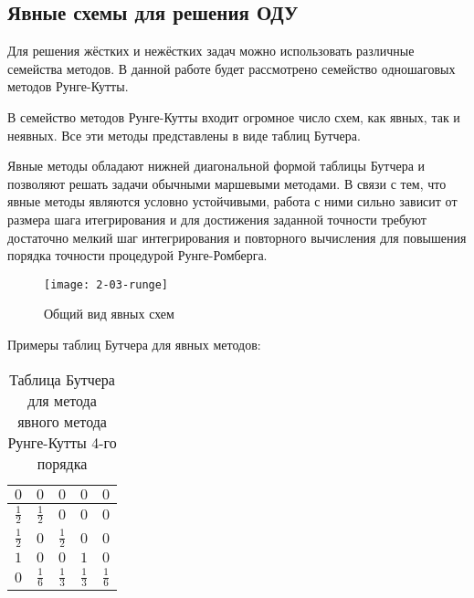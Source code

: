 \subsection{Явные схемы для решения ОДУ}

Для решения жёстких и нежёстких задач можно использовать различные семейства методов. В данной работе будет рассмотрено семейство
одношаговых методов Рунге-Кутты.

В семейство методов Рунге-Кутты входит огромное число схем, как явных, так и неявных. Все эти методы представлены в виде таблиц
Бутчера.

Явные методы обладают нижней диагональной формой таблицы Бутчера и позволяют решать задачи обычными маршевыми методами. В связи с тем,
что явные методы являются условно устойчивыми, работа с ними сильно зависит от размера шага итегрирования и для достижения заданной
точности требуют достаточно мелкий шаг интегрирования и повторного вычисления для повышения порядка точности процедурой Рунге-Ромберга.



\begin{figure}
    \texttt{[image: 2-03-runge]}
    \caption{Общий вид явных схем}
    \label{fig:runge}
\end{figure}

Примеры таблиц Бутчера для явных методов:

\begin{table}    
    \caption{Таблица Бутчера для метода явного метода Рунге-Кутты 4-го порядка}
    \begin{tabular}{|c|c|c|c|c|}
    \hline
    $0$ & $0$ & $0$ & $0$ & $0$\\
    \hline
    $\frac{1}{2}$ & $\frac{1}{2}$ & $0$ & $0$ & $0$\\
    \hline
    $\frac{1}{2}$ & $0$ & $\frac{1}{2}$ & $0$ & $0$\\
    \hline
    $1$ & $0$ & $0$ & $1$ & $0$\\
    \hline
    $0$ & \cellcolor{lightgray} $\frac{1}{6}$ & \cellcolor{lightgray} $\frac{1}{3}$ & \cellcolor{lightgray} $\frac{1}{3}$ & \cellcolor{lightgray} $\frac{1}{6}$\\
    \hline
    \end{tabular}
    \label{tab:RK4}
\end{table}

